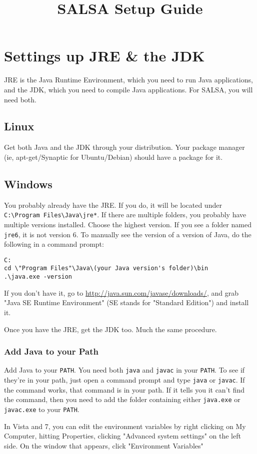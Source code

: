 \documentclass{article}
\title{SALSA Setup Guide}
\newcommand{\bslash}{\textbackslash}
\newcommand{\envPATH}{\texttt{PATH}}
\begin{document}
\marginsize{1 in}{1 in}{1 in}{1 in}

\section{Settings up JRE \& the JDK}
JRE is the Java Runtime Environment, which you need to run Java applications,
and the JDK, which you need to compile Java applications. For SALSA, you will
need both.

\subsection{Linux}
Get both Java and the JDK through your distribution. Your package manager
(ie, apt-get/Synaptic for Ubuntu/Debian) should have a package for it.

\subsection{Windows}
You probably already have the JRE. If you do, it will be located under
\texttt{C:\bslash Program Files\bslash Java\bslash jre*}. If there are
multiple folders, you probably have multiple versions installed. Choose
the highest version. If you see a folder named \texttt{jre6}, it is not
version 6. To manually see the version of a version of Java, do the
following in a command prompt:
\begin{lstlisting}
C:
cd \"Program Files"\Java\(your Java version's folder)\bin
.\java.exe -version
\end{lstlisting}

If you don't have it, go to \url{http://java.sun.com/javase/downloads/}, and grab "Java SE Runtime Environment" (SE stands for "Standard Edition") and install it.

Once you have the JRE, get the JDK too. Much the same procedure.

\subsubsection{Add Java to your Path}
Add Java to your \envPATH. You need both \texttt{java} and \texttt{javac}
in your \envPATH. To see if they're in your path, just open a command
prompt and type \texttt{java} or \texttt{javac}. If the command works, that
command is in your path. If it tells you it can't find the command, then you
need to add the folder containing either \texttt{java.exe} or
\texttt{javac.exe} to your \envPATH.

In Vista and 7, you can edit the environment variables by right clicking on
My Computer, hitting Properties, clicking "Advanced system settings" on the left
side. On the window that appears, click "Environment Variables"
\end{document}
